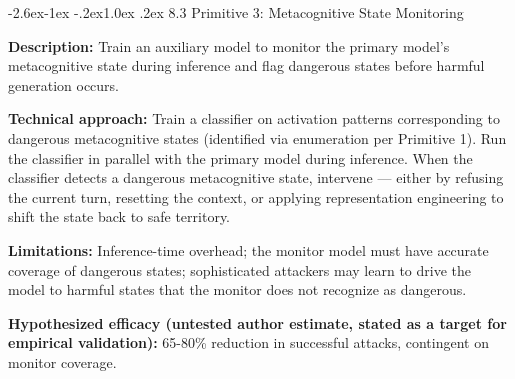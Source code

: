 \documentclass[
  11pt,
]{article}
\makeatletter
\renewcommand\subsection{\@startsection{subsection}{2}{\z@}%
  {-2.6ex\@plus -1ex \@minus -.2ex}{1.0ex \@plus .2ex}%
  {\normalfont\sffamily\large\bfseries}}
\makeatother
\begin{document}
\subsection{8.3 Primitive 3: Metacognitive State
Monitoring}\label{primitive-3-metacognitive-state-monitoring}

\textbf{Description:} Train an auxiliary model to monitor the primary
model's metacognitive state during inference and flag dangerous states
before harmful generation occurs.

\textbf{Technical approach:} Train a classifier on activation patterns
corresponding to dangerous metacognitive states (identified via
enumeration per Primitive 1). Run the classifier in parallel with the
primary model during inference. When the classifier detects a dangerous
metacognitive state, intervene --- either by refusing the current turn,
resetting the context, or applying representation engineering to shift
the state back to safe territory.

\textbf{Limitations:} Inference-time overhead; the monitor model must
have accurate coverage of dangerous states; sophisticated attackers may
learn to drive the model to harmful states that the monitor does not
recognize as dangerous.

\textbf{Hypothesized efficacy (untested author estimate, stated as a target for empirical validation):} 65-80\% reduction in successful attacks,
contingent on monitor coverage.
\end{document}
